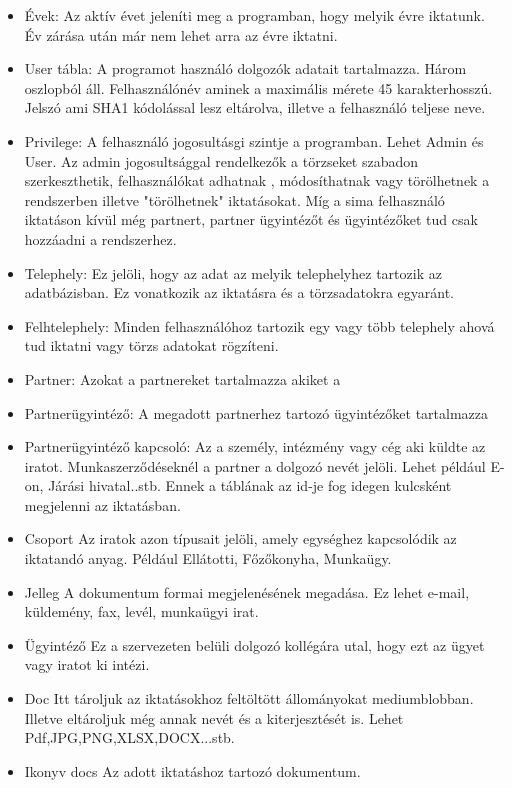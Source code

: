 \documentclass[conference]{IEEEtran}
\begin{document}
\begin{itemize}
	\item Évek:
	Az aktív évet jeleníti meg a programban, hogy melyik évre iktatunk. Év zárása után már nem lehet arra az évre iktatni.
	\item User tábla:
	A programot használó dolgozók adatait tartalmazza. Három oszlopból áll. Felhasználónév aminek a maximális mérete 45 karakterhosszú. Jelszó ami SHA1 kódolással lesz eltárolva, illetve a felhasználó teljese neve.
	\item Privilege:
	A felhasználó jogosultásgi szintje a programban. Lehet Admin és User. Az admin jogosultsággal rendelkezők a törzseket szabadon szerkeszthetik, felhasználókat adhatnak , módosíthatnak vagy törölhetnek a rendszerben illetve "törölhetnek" iktatásokat.
	Míg a sima felhasználó iktatáson kívül még partnert, partner ügyintézőt és ügyintézőket tud csak hozzáadni a rendszerhez.
	\item Telephely:
	Ez jelöli, hogy az adat az melyik telephelyhez tartozik az adatbázisban. Ez vonatkozik az iktatásra és a törzsadatokra egyaránt.	
	\item Felhtelephely:	
	Minden felhasználóhoz tartozik egy vagy több telephely ahová tud iktatni vagy törzs adatokat rögzíteni. 
	\item Partner:	
	Azokat a partnereket tartalmazza akiket a
	\item Partnerügyintéző:
	A megadott partnerhez tartozó ügyintézőket tartalmazza
	\item Partnerügyintéző kapcsoló:
	Az a személy, intézmény vagy cég aki küldte az iratot. Munkaszerződéseknél a partner a dolgozó nevét jelöli. Lehet például E-on, Járási hivatal..stb. Ennek a táblának az id-je fog idegen kulcsként megjelenni az iktatásban.
	\item Csoport
	Az iratok azon típusait jelöli, amely egységhez kapcsolódik az iktatandó anyag. Például Ellátotti, Főzőkonyha, Munkaügy.
	\item Jelleg
	A dokumentum formai megjelenésének megadása. Ez lehet e-mail, küldemény, fax, levél, munkaügyi irat.
	\item Ügyintéző	
	Ez a szervezeten belüli dolgozó kollégára utal, hogy ezt az ügyet vagy iratot ki intézi.
	\item Doc
	Itt tároljuk az iktatásokhoz feltöltött állományokat mediumblobban. Illetve eltároljuk még annak nevét és a kiterjesztését is. Lehet Pdf,JPG,PNG,XLSX,DOCX...stb.
	\item Ikonyv docs
	Az adott iktatáshoz tartozó dokumentum.

\end{itemize}
\end{document}
